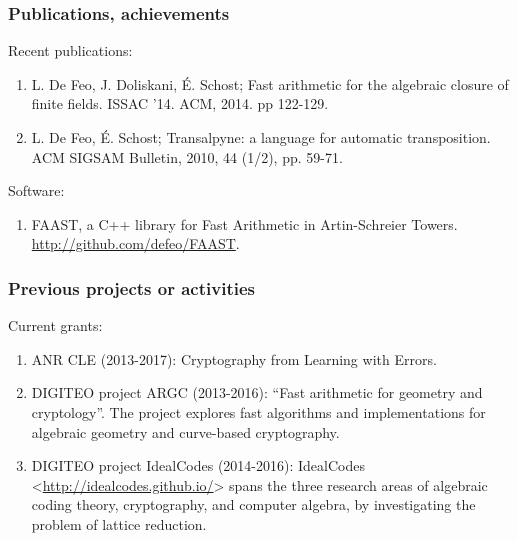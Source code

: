 
%

\subsubsection*{Publications, achievements}

Recent publications:

\begin{enumerate}
\item L. De Feo, J. Doliskani, É. Schost; Fast arithmetic for the
  algebraic closure of finite fields. ISSAC '14. ACM, 2014. pp
  122-129.
\item L. De Feo, É. Schost; Transalpyne: a language for automatic
  transposition. ACM SIGSAM Bulletin, 2010, 44 (1/2), pp. 59-71.
\end{enumerate}

Software:

\begin{enumerate}
\item FAAST, a C++ library for Fast Arithmetic in Artin-Schreier
  Towers. \url{http://github.com/defeo/FAAST}.
\end{enumerate}

\subsubsection*{Previous projects or activities}

Current grants:

\begin{enumerate}
\item ANR CLE (2013-2017): Cryptography from Learning with Errors.
\item DIGITEO project ARGC (2013-2016): ``Fast arithmetic for geometry
  and cryptology''. The project explores fast algorithms and
  implementations for algebraic geometry and curve-based cryptography.
\item DIGITEO project IdealCodes (2014-2016): IdealCodes
  <\url{http://idealcodes.github.io/}> spans the three research areas
  of algebraic coding theory, cryptography, and computer algebra, by
  investigating the problem of lattice reduction.
\end{enumerate}



